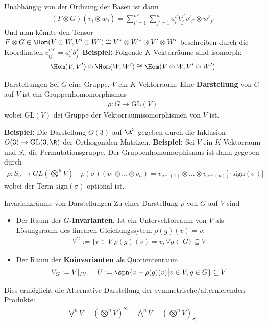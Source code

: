 Unabhängig von der Ordnung der Basen ist dann
\begin{align*}
    (F \otimes G)(v_i \otimes w_j) = \sum_{i' = 1}^{m'} \sum_{j' = 1}^{n} a_{i}^{i'} b_{j}^{j'} v'_{i'} \otimes w'_{j'}
\end{align*}
Und man könnte den Tensor $F \otimes G \in \Hom(V \otimes W, V' \otimes W') \cong V^* \otimes W^* \otimes V' \otimes W'$ beschreiben durch die Koordinaten $c_{ij}^{i'j'} = a_{i}^{i'}b_{j}^{j'}$
\textbf{Beispiel:} \quad Folgende $K$-Vektorräume sind isomorph:
\begin{align*}
    \Hom(V,V') \otimes \Hom(W,W') \cong \Hom(V \otimes W, V' \otimes W')
\end{align*}


\begin{definition}{Darstellungen}
    Sei $G$ eine Gruppe, $V$ ein $K$-Vektorraum. Eine \textbf{Darstellung} von $G$ auf $V$ ist ein Gruppenhomomorphismus
    \begin{align*}
        \rho: G \to \text{GL}(V)
    \end{align*}
    wobei $\text{GL}(V)$ dei Gruppe der Vektorraumisomorphismen von $V$ ist.
\end{definition}

\textbf{Beispiel:} Die Darstellung $O(3)$ auf $\R^3$ gegeben durch die Inklusion $O(3) \to \text{GL}(3,\R)$ der Orthogonalen Matrizen.
\textbf{Beispiel:} Sei $V$ ein $K$-Vektorraum und $S_n$ die Permutationsgruppe. Der Gruppenhomomorphismus ist dann gegeben durch
\begin{align*}
    \rho: S_n \to GL(\bigotimes^n V) \quad \rho(\sigma)(v_1 \otimes \ldots \otimes v_n) = v_{\sigma^{-1}(1)} \otimes \ldots \otimes v_{\sigma^{-1}(n)} \big[\cdot \text{sign}(\sigma) \big]
\end{align*}
wobei der Term $\text{sign}(\sigma)$ optional ist.

\begin{definition}{Invarianzräume von Darstellungen}
    Zu einer Darstellung $\rho$ von $G$ auf $V$ sind
    \begin{itemize}
        \item   Der Raum der $G$\textbf{-Invarianten}. Ist ein Untervektorraum von $V$ als Lösungsraum des linearen Gleichungssytem $\rho(g)(v) = v$.
        \begin{align*}
            V^G := \{v \in V \big\vert \rho(g)(v) = v, \forall g \in G\} \subseteq V
        \end{align*}
        \item   Der Raum der \textbf{Koinvarianten} als Quotientenraum
        \begin{align*}
            V_G := V|_{/ U}, \quad U := \spn\{v - \rho(g)(v) \big\vert v \in V, g \in G\} \subseteq V
        \end{align*}
    \end{itemize}
\end{definition}
Dies ermöglicht die Alternative Darstellung der symmetrische/alternierenden Produkte:
\begin{align*}
    \bigvee^nV = \left(\bigotimes^n V\right)^{S_n} \quad \bigwedge^n V = (\bigotimes^nV)_{S_n}
\end{align*}


